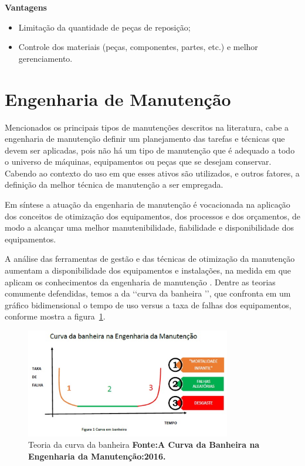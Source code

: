 		\textbf{Vantagens}	

			\begin{itemize}
				\item Limitação da quantidade de peças de reposição; 
				\item Controle dos materiais (peças, componentes, partes, etc.) e melhor gerenciamento.
			\end{itemize}


\section{Engenharia de Manutenção}

Mencionados os principais tipos de manutenções descritos na literatura, cabe a engenharia de manutenção definir um planejamento das tarefas e técnicas que devem ser aplicadas, pois não há um tipo de manutenção que é adequado a todo o universo de máquinas, equipamentos ou peças que se desejam conservar. Cabendo ao contexto do uso em que esses ativos são utilizados, e outros fatores, a definição da melhor técnica de manutenção a ser empregada.

Em síntese a atuação da engenharia de manutenção é vocacionada na aplicação dos conceitos de otimização dos equipamentos, dos processos e dos orçamentos, de modo a alcançar uma melhor manutenibilidade, fiabilidade e disponibilidade dos equipamentos. 

A análise das ferramentas de gestão e das técnicas de otimização da manutenção aumentam a disponibilidade dos equipamentos e instalações, na medida em que aplicam os conhecimentos da engenharia de manutenção \cite{xenos1998gerenciando}. Dentre as teorias comumente defendidas, temos a da \lq\lq curva da banheira \rq\rq, que confronta em um gráfico bidimensional o tempo de uso versus a taxa de falhas dos equipamentos, conforme mostra a figura~\ref{Curva da banheira}.

\graphicspath{{figuras/}}
\begin{figure}[H]
\centering
\includegraphics[width=0.8\textwidth]{curva_da_banheira.eps}
\caption{Teoria da curva da banheira \textbf{Fonte:A Curva da Banheira na Engenharia da Manutenção:2016.}}
\label{Curva da banheira}
\end{figure}

